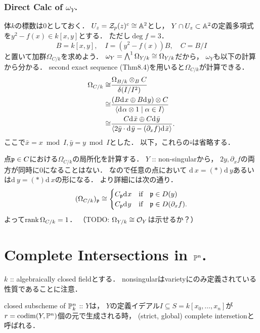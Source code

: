 \documentclass[a4paper]{jsarticle}
\newcommand{\der}[1][\!]{\mathrm{d}_{#1}\,}
\newcommand{\Der}{\Omega}
\newcommand{\shCano}{\omega}
\begin{document}
    \subsubsection{Direct Calc of $\shCano_Y$.}
    体$k$の標数は$0$としておく．
    $U_z=\mathcal{Z}_p(z)^c \cong \mathbb{A}^2$とし，
    $Y \cap U_z \subset \mathbb{A}^2$の定義多項式を$y^2-f(x) \in k[x,y]$とする．
    ただし$\deg f=3$．
    \[ B=k[x,y], \quad I=(y^2-f(x))B, \quad C=B/I \]
    と置いて加群$\Der_{C/k}$を求めよう．
    $\shCano_Y=\bigwedge^1 \Der_{Y/k} \iso \Der_{Y/k}$だから，
    $\shCano_Y$も以下の計算から分かる．
    second exact sequence (Thm8.4)を用いると$\Der_{C/k}$が計算できる．
    \begin{align*}
                \Der_{C/k}
        \iso&   \frac{\Der_{B/k} \otimes_B C}{\delta(I/I^2)} \\
        \iso&   \frac{(B \der x \oplus B \der y) \otimes C}
                {\langle \der \alpha \otimes 1 \mid \alpha \in I \rangle} \\
        \iso&   \frac{C \der \bar{x} \oplus C \der \bar{y}}
                {\langle 2 \bar{y} \cdot \der \bar{y} -(\partial_x f) \der \bar{x} \rangle}.
    \end{align*}
    ここで$\bar{x}=x \bmod I, \bar{y}=y \bmod I$とした．
    以下，これらの$\bar{\square}$は省略する．
    
    点$\mathfrak{p} \in C$における$\Der_{C/k}$の局所化を計算する．
    $Y$ :: non-singularから，
    $2y, \partial_x f$の両方が同時に$0$になることはない．
    なので任意の点において
    $\der x=(*) \der y$あるいは$\der y=(*) \der x$の形になる．
    より詳細には次の通り．
    \[
        (\Der_{C/k})_{\I{p}} \iso
        \begin{cases}{}
            C_{\I{p}} \der x & \text{if} \quad \I{p} \in D(y) \\
            C_{\I{p}} \der y & \text{if} \quad \I{p} \in D(\partial_x f). \\
        \end{cases}
    \]
    よって$\rank \Der_{C/k}=1$．
    （TODO: $\Der_{Y/k} \iso \shO_Y$は示せるか？）

\section{Complete Intersections in $\mathbb{P}^n$.} %
    $k$ :: algebraically closed fieldとする．
    nonsingularはvarietyにのみ定義されている性質であることに注意．

    \begin{Def}
        closed subscheme of $\mathbb{P}^n_k$ :: $Y$は，
        $Y$の定義イデアル$I \subseteq S=k[x_0,\dots,x_n]$が
        $r=\operatorname{codim} (Y, \mathbb{P}^n)$個の元で生成される時，
        (strict, global) complete intersetionと呼ばれる．
    \end{Def}
\end{document}
